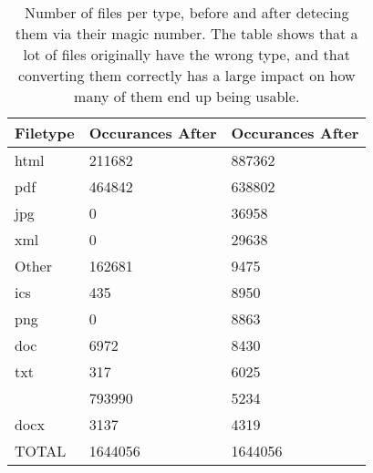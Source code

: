 \begin{table}[ht]
\centering
\begin{tabular}{lll}
  \hline
Filetype & Occurances After & Occurances After \\ 
  \hline
html & 211682 & 887362 \\ 
  pdf & 464842 & 638802 \\ 
  jpg & 0 & 36958 \\ 
  xml & 0 & 29638 \\ 
  Other & 162681 & 9475 \\ 
  ics & 435 & 8950 \\ 
  png & 0 & 8863 \\ 
  doc & 6972 & 8430 \\ 
  txt & 317 & 6025 \\ 
   & 793990 & 5234 \\ 
  docx & 3137 & 4319 \\ 
  TOTAL & 1644056 & 1644056 \\ 
   \hline
\end{tabular}
\caption{Number of files per type, before and after detecing them via their magic number. The table shows that a lot of files originally have the wrong type, and that converting them correctly has a large impact on how many of them end up being usable.}
\label{tab:filetypes} 
\end{table}

